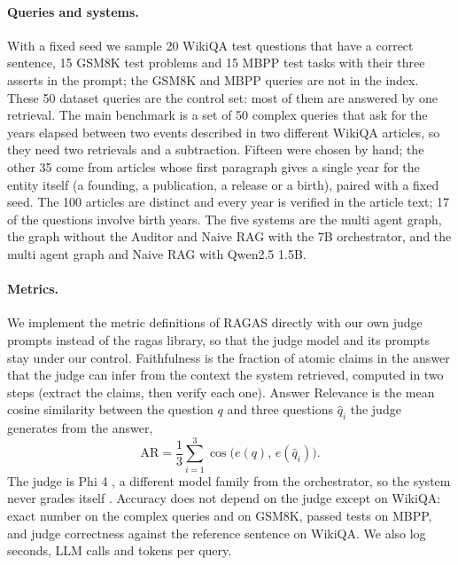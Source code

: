 \documentclass{article}
\begin{document}
\paragraph{Queries and systems.}
With a fixed seed we sample 20 WikiQA test questions that have a correct sentence, 15 GSM8K test problems and 15 MBPP test tasks with their three asserts in the prompt; the GSM8K and MBPP queries are not in the index. These 50 dataset queries are the control set: most of them are answered by one retrieval. The main benchmark is a set of 50 complex queries that ask for the years elapsed between two events described in two different WikiQA articles, so they need two retrievals and a subtraction. Fifteen were chosen by hand; the other 35 come from articles whose first paragraph gives a single year for the entity itself (a founding, a publication, a release or a birth), paired with a fixed seed. The 100 articles are distinct and every year is verified in the article text; 17 of the questions involve birth years. The five systems are the multi agent graph, the graph without the Auditor and Naive RAG with the 7B orchestrator, and the multi agent graph and Naive RAG with Qwen2.5 1.5B.

\paragraph{Metrics.}
We implement the metric definitions of RAGAS \citep{es2024ragas} directly with our own judge prompts instead of the ragas library, so that the judge model and its prompts stay under our control. Faithfulness is the fraction of atomic claims in the answer that the judge can infer from the context the system retrieved, computed in two steps (extract the claims, then verify each one). Answer Relevance is the mean cosine similarity between the question $q$ and three questions $\hat q_i$ the judge generates from the answer,
\begin{equation}
\mathrm{AR} = \frac{1}{3}\sum_{i=1}^{3} \cos\big(e(q),\, e(\hat q_i)\big).
\end{equation}
The judge is Phi 4 \citep{abdin2024phi4}, a different model family from the orchestrator, so the system never grades itself \citep{zheng2023judging}. Accuracy does not depend on the judge except on WikiQA: exact number on the complex queries and on GSM8K, passed tests on MBPP, and judge correctness against the reference sentence on WikiQA. We also log seconds, LLM calls and tokens per query.
\end{document}
